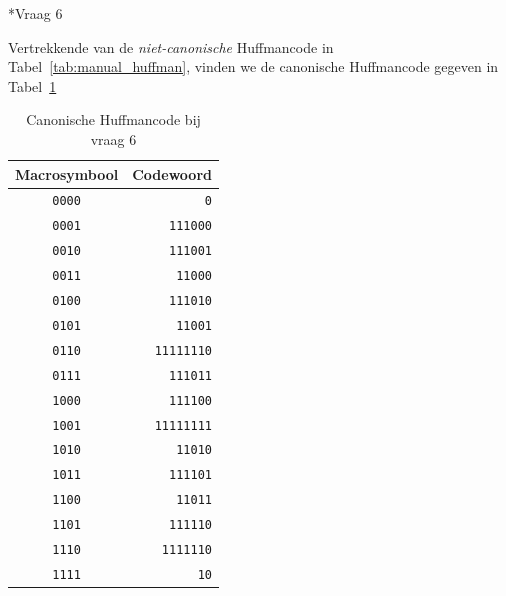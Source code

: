 \documentclass[]{article}
\begin{document}
\begin{section}
\begin{subsection}

    \end{subsection}

    \begin{subsection}*{Vraag 6}

        Vertrekkende van de \emph{niet-canonische} Huffmancode in
        Tabel~\ref{tab:manual_huffman}, vinden we de canonische
        Huffmancode gegeven in Tabel~\ref{tab:canonical_huffman}

        \begin{table}
            \centering
            \begin{tabular}{c|r}
                \textbf{Macrosymbool} &
                \textbf{Codewoord} \\
                \hline
                \texttt{0000} & \texttt{0} \\
                \texttt{0001} & \texttt{111000} \\
                \texttt{0010} & \texttt{111001} \\
                \texttt{0011} & \texttt{11000} \\
                \texttt{0100} & \texttt{111010} \\
                \texttt{0101} & \texttt{11001} \\
                \texttt{0110} & \texttt{11111110} \\
                \texttt{0111} & \texttt{111011} \\
                \texttt{1000} & \texttt{111100} \\
                \texttt{1001} & \texttt{11111111} \\
                \texttt{1010} & \texttt{11010} \\
                \texttt{1011} & \texttt{111101} \\
                \texttt{1100} & \texttt{11011} \\
                \texttt{1101} & \texttt{111110} \\
                \texttt{1110} & \texttt{1111110} \\
                \texttt{1111} & \texttt{10} \\
            \end{tabular}
            \caption{Canonische Huffmancode bij vraag 6}
            \label{tab:canonical_huffman}
        \end{table}

    \end{subsection}


\end{section}
\end{document}
